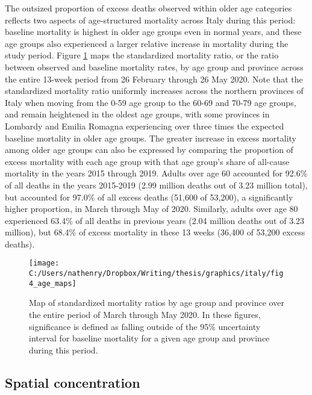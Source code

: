 \documentclass[
]{article}
\begin{document}
The outsized proportion of excess deaths observed within older age categories reflects two aspects of age-structured mortality across Italy during this period: baseline mortality is highest in older age groups even in normal years, and these age groups also experienced a larger relative increase in mortality during the study period. Figure \ref{fig:age-maps} maps the standardized mortality ratio, or the ratio between observed and baseline mortality rates, by age group and province across the entire 13-week period from 26 February through 26 May 2020. Note that the standardized mortality ratio uniformly increases across the northern provinces of Italy when moving from the 0-59 age group to the 60-69 and 70-79 age groups, and remain heightened in the oldest age groups, with some provinces in Lombardy and Emilia Romagna experiencing over three times the expected baseline mortality in older age groups. The greater increase in excess mortality among older age groups can also be expressed by comparing the proportion of excess mortality with each age group with that age group's share of all-cause mortality in the years 2015 through 2019. Adults over age 60 accounted for 92.6\% of all deaths in the years 2015-2019 (2.99 million deaths out of 3.23 million total), but accounted for 97.0\% of all excess deaths (51,600 of 53,200), a significantly higher proportion, in March through May of 2020. Similarly, adults over age 80 experienced 63.4\% of all deaths in previous years (2.04 million deaths out of 3.23 million), but 68.4\% of excess mortality in these 13 weeks (36,400 of 53,200 excess deaths).

\begin{figure}[!hbt]

{\centering \texttt{[image: C:/Users/nathenry/Dropbox/Writing/thesis/graphics/italy/fig4\_age\_maps]} 

}

\caption{Map of standardized mortality ratios by age group and province over the entire period of March through May 2020. In these figures, significance is defined as falling outside of the 95\% uncertainty interval for baseline mortality for a given age group and province during this period.}\label{fig:age-maps}
\end{figure}

\hypertarget{spatial-concentration}{%
\subsection{Spatial concentration}\label{spatial-concentration}}
\end{document}
